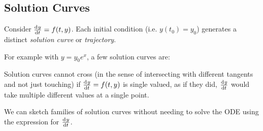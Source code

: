 \documentclass[../main.tex]{subfiles}
\begin{document}
\subsection{Solution Curves}
Consider $\deriv{y}{t} = f(t, y)$.
Each initial condition (i.e. $y(t_0) = y_0$) generates a distinct \textit{solution curve} or \textit{trajectory}.

For example with $y = y_0 e^{x}$, a few solution curves are:
\begin{center}
\end{center}
\begin{remark}
  Solution curves cannot cross (in the sense of intersecting with different tangents and not just touching) if $\deriv{y}{t} = f(t, y)$ is single valued, as if they did, $\deriv{y}{t}$ would take multiple different values at a single point.
\end{remark}
We can sketch families of solution curves without needing to solve the ODE using the expression for $\deriv{y}{t}$.
\end{document}
